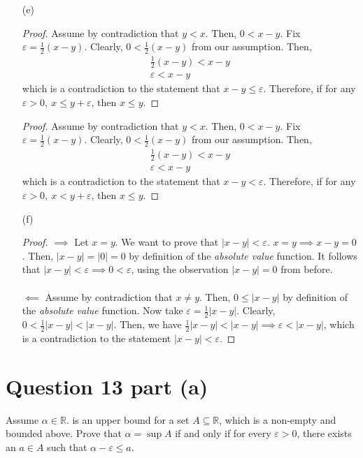 \documentclass[13pt]{article}
\begin{document}
\begin{enumerate}
\item [(e)]
  \begin{proof}
    Assume by contradiction that $y < x$. Then, $0 < x - y$. Fix $\varepsilon = \frac{1}{2}(x - y)$.
    Clearly, $0 < \frac{1}{2}(x - y)$ from our assumption. Then,
    \begin{align*}
      \frac{1}{2}(x - y) < x - y \\
      \varepsilon < x - y
    \end{align*}
    which is a contradiction to the statement that $x - y \leq \varepsilon$. Therefore, if for any
    $\varepsilon > 0, \ x \leq y + \varepsilon$, then $x \leq y$.
  \end{proof}
  \begin{proof}
    Assume by contradiction that $y < x$. Then, $0 < x - y$. Fix $\varepsilon = \frac{1}{2}(x - y)$.
    Clearly, $0 < \frac{1}{2}(x - y)$ from our assumption. Then,
    \begin{align*}
      \frac{1}{2}(x - y) < x - y \\
      \varepsilon < x - y
    \end{align*}
    which is a contradiction to the statement that $x - y < \varepsilon$. Therefore, if for any
    $\varepsilon > 0, \ x < y + \varepsilon$, then $x \leq y$.
  \end{proof}

\item [(f)]
  \begin{proof}
    $\implies$ Let $x = y$. We want to prove that $|x - y| < \varepsilon$. $x = y \implies x - y = 0$.
    Then, $|x - y| = |0| = 0$ by definition of the \textit{absolute value} function. It follows that
    $|x - y| < \varepsilon \implies 0 < \varepsilon$, using the observation $|x - y| = 0$ from before. \\ \\
    $\impliedby$ Assume by contradiction that $x \neq y$. Then, $0 \leq |x - y|$ by definition of the
    \textit{absolute value} function. Now take $\varepsilon = \frac{1}{2}|x - y|$. Clearly, $0 < \frac{1}{2}
    |x - y| < |x - y|$. Then, we have $\frac{1}{2}|x - y| < |x - y| \implies \varepsilon < |x - y|$, which
    is a contradiction to the statement $|x - y| < \varepsilon$.
  \end{proof}
\end{enumerate}

\newpage
\section*{Question 13 part (a)}
Assume $\alpha \in \mathbb{R}$. is an upper bound for a set $A \subseteq \mathbb{R}$, which is a
non-empty and bounded above. Prove that $\alpha = \sup{A}$ if and only if for every $\varepsilon
> 0$, there exists an $a \in A$ such that $\alpha - \varepsilon \leq a$.
\end{document}
